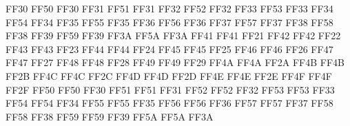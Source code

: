 \setcclcucx FF30 FF50 FF30 %
\setcclcucx FF31 FF51 FF31 %
\setcclcucx FF32 FF52 FF32 %
\setcclcucx FF33 FF53 FF33 %
\setcclcucx FF34 FF54 FF34 %
\setcclcucx FF35 FF55 FF35 %
\setcclcucx FF36 FF56 FF36 %
\setcclcucx FF37 FF57 FF37 %
\setcclcucx FF38 FF58 FF38 %
\setcclcucx FF39 FF59 FF39 %
\setcclcucx FF3A FF5A FF3A %
\setcclcucx FF41 FF41 FF21 %
\setcclcucx FF42 FF42 FF22 %
\setcclcucx FF43 FF43 FF23 %
\setcclcucx FF44 FF44 FF24 %
\setcclcucx FF45 FF45 FF25 %
\setcclcucx FF46 FF46 FF26 %
\setcclcucx FF47 FF47 FF27 %
\setcclcucx FF48 FF48 FF28 %
\setcclcucx FF49 FF49 FF29 %
\setcclcucx FF4A FF4A FF2A %
\setcclcucx FF4B FF4B FF2B %
\setcclcucx FF4C FF4C FF2C %
\setcclcucx FF4D FF4D FF2D %
\setcclcucx FF4E FF4E FF2E %
\setcclcucx FF4F FF4F FF2F %
\setcclcucx FF50 FF50 FF30 %
\setcclcucx FF51 FF51 FF31 %
\setcclcucx FF52 FF52 FF32 %
\setcclcucx FF53 FF53 FF33 %
\setcclcucx FF54 FF54 FF34 %
\setcclcucx FF55 FF55 FF35 %
\setcclcucx FF56 FF56 FF36 %
\setcclcucx FF57 FF57 FF37 %
\setcclcucx FF58 FF58 FF38 %
\setcclcucx FF59 FF59 FF39 %
\setcclcucx FF5A FF5A FF3A %


